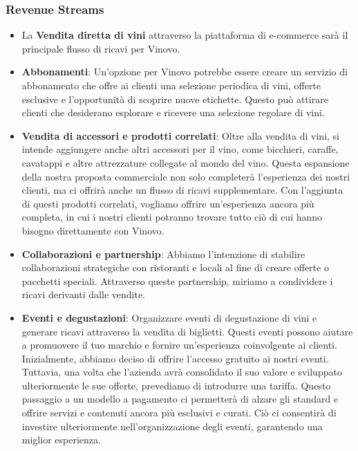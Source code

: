 \documentclass[12pt, a4paper]{article}
\begin{document}
\subsubsection{Revenue Streams}
\begin{itemize}
    \item La \textbf{Vendita diretta di vini} attraverso la piattaforma di e-commerce sarà il principale flusso di ricavi per Vinovo.
    \item \textbf{Abbonamenti}: Un'opzione per Vinovo potrebbe essere creare un servizio di abbonamento che offre ai clienti una selezione periodica di vini, offerte esclusive e l'opportunità di scoprire nuove etichette. Questo può attirare clienti che desiderano esplorare e ricevere una selezione regolare di vini.
    \item \textbf{Vendita di accessori e prodotti correlati}: Oltre alla vendita di vini, si intende aggiungere anche altri accessori per il vino, come bicchieri, caraffe, cavatappi e altre attrezzature collegate al mondo del vino. Questa espansione della nostra proposta commerciale non solo completerà l'esperienza dei nostri clienti, ma ci offrirà anche un flusso di ricavi supplementare. Con l'aggiunta di questi prodotti correlati, vogliamo offrire un'esperienza ancora più completa, in cui i nostri clienti potranno trovare tutto ciò di cui hanno bisogno direttamente con Vinovo.
    \item \textbf{Collaborazioni e partnership}: Abbiamo l'intenzione di stabilire collaborazioni strategiche con ristoranti e locali al fine di creare offerte o pacchetti speciali. Attraverso queste partnership, miriamo a condividere i ricavi derivanti dalle vendite.
    \item \textbf{Eventi e degustazioni}: Organizzare eventi di degustazione di vini e generare ricavi attraverso la vendita di biglietti. Questi eventi possono aiutare a promuovere il tuo marchio e fornire un'esperienza coinvolgente ai clienti.\\ Inizialmente, abbiamo deciso di offrire l'accesso gratuito ai nostri eventi. Tuttavia, una volta che l'azienda avrà consolidato il suo valore e sviluppato ulteriormente le sue offerte, prevediamo di introdurre una tariffa. Questo passaggio a un modello a pagamento ci permetterà di alzare gli standard e offrire servizi e contenuti ancora più esclusivi e curati. Ciò ci consentirà di investire ulteriormente nell'organizzazione degli eventi, garantendo una miglior esperienza.

\end{itemize}
\end{document}
